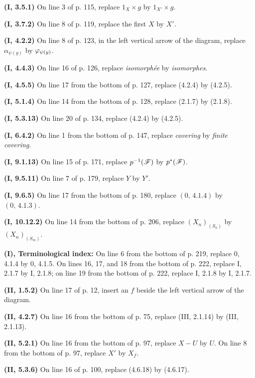 \noindent\textbf{(I, 3.5.1)} On line 3 of p. 115, replace $1_X\times g$ by
$1_{X'}\times g$.

\noindent\textbf{(I, 3.7.2)} On line 8 of p. 119, replace the first $X$ by
$X'$.

\noindent\textbf{(I, 4.2.2)} On line 8 of p. 123, in the left vertical arrow
of the diagram, replace $\alpha_{\psi(y)}$ by $\varphi_{\psi(y)}$.

\noindent\textbf{(I, 4.4.3)} On line 16 of p. 126, replace \emph{isomorphée}
by \emph{isomorphes}.

\noindent\textbf{(I, 4.5.5)} On line 17 from the bottom of p. 127, replace
(4.2.4) by (4.2.5).

\noindent\textbf{(I, 5.1.4)} On line 14 from the bottom of p. 128, replace
(2.1.7) by (2.1.8).

\noindent\textbf{(I, 5.3.13)} On line 20 of p. 134, replace (4.2.4) by
(4.2.5).

\noindent\textbf{(I, 6.4.2)} On line 1 from the bottom of p. 147, replace
\emph{covering} by \emph{finite covering}.

\noindent\textbf{(I, 9.1.13)} On line 15 of p. 171, replace
$p^{-1}(\mathscr{F})$ by $p^*(\mathscr{F})$.

\noindent\textbf{(I, 9.5.11)} On line 7 of p. 179, replace $Y$ by $Y'$.

\noindent\textbf{(I, 9.6.5)} On line 17 from the bottom of p. 180, replace
$(0,\,4.1.4)$ by $(0,\,4.1.3)$.

\noindent\textbf{(I, 10.12.2)} On line 14 from the bottom of p. 206, replace
$(X_n)_{(S_n)}$ by $(X_n)_{(S_m)}$.

\clearpage
{}
\noindent\textbf{(I), Terminological index:} On line 6 from the bottom of p.
219, replace 0, 4.1.4 by 0, 4.1.5. On lines 16, 17, and 18 from the bottom of
p. 222, replace I, 2.1.7 by I, 2.1.8; on line 19 from the bottom of p. 222,
replace I, 2.1.8 by I, 2.1.7.

\noindent\textbf{(II, 1.5.2)} On line 17 of p. 12, insert an $f$ beside the
left vertical arrow of the diagram.

\noindent\textbf{(II, 4.2.7)} On line 16 from the bottom of p. 75, replace
(III, 2.1.14) by (III, 2.1.13).

\noindent\textbf{(II, 5.2.1)} On line 16 from the bottom of p. 97, replace
$X-U$ by $U$. On line 8 from the bottom of p. 97, replace $X'$ by $X_f$.

\noindent\textbf{(II, 5.3.6)} On line 16 of p. 100, replace (4.6.18) by
(4.6.17).

